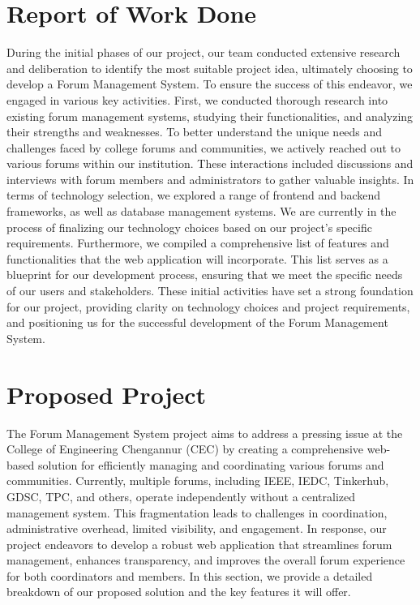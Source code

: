 \documentclass[twocolumn,10pt]{article}
\begin{document}
\section{\label{work}Report of Work Done}
During the initial phases of our project, our team conducted extensive research and deliberation to identify the most suitable project idea, ultimately choosing to develop a Forum Management System. To ensure the success of this endeavor, we engaged in various key activities. First, we conducted thorough research into existing forum management systems, studying their functionalities, and analyzing their strengths and weaknesses. To better understand the unique needs and challenges faced by college forums and communities, we actively reached out to various forums within our institution. These interactions included discussions and interviews with forum members and administrators to gather valuable insights. In terms of technology selection, we explored a range of frontend and backend frameworks, as well as database management systems. We are currently in the process of finalizing our technology choices based on our project's specific requirements. Furthermore, we compiled a comprehensive list of features and functionalities that the web application will incorporate. This list serves as a blueprint for our development process, ensuring that we meet the specific needs of our users and stakeholders. These initial activities have set a strong foundation for our project, providing clarity on technology choices and project requirements, and positioning us for the successful development of the Forum Management System.
\section{Proposed Project}
The Forum Management System project aims to address a pressing issue at the College of Engineering Chengannur (CEC) by creating a comprehensive web-based solution for efficiently managing and coordinating various forums and communities. Currently, multiple forums, including IEEE, IEDC, Tinkerhub, GDSC, TPC, and others, operate independently without a centralized management system. This fragmentation leads to challenges in coordination, administrative overhead, limited visibility, and engagement. In response, our project endeavors to develop a robust web application that streamlines forum management, enhances transparency, and improves the overall forum experience for both coordinators and members. In this section, we provide a detailed breakdown of our proposed solution and the key features it will offer.
\end{document}
